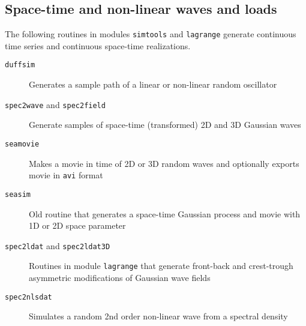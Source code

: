 \subsection{Space-time and non-linear waves and loads}
The following routines in modules {\tt simtools} and {\tt lagrange} generate 
continuous time series and continuous space-time realizations. 
\begin{description}
\item[{\tt duffsim}] Generates a sample path of a 
linear or non-linear random oscillator 
\item[{\tt spec2wave} and {\tt spec2field}] Generate samples of space-time 
(transformed) 
 2D and 3D Gaussian waves  
\item[{\tt seamovie}] Makes a movie in time of 2D or 3D random waves
and optionally exports movie in {\tt avi} format  
\item[{\tt seasim}] Old routine that generates a space-time Gaussian process and movie 
with 1D or 2D space parameter 
\item[{\tt spec2ldat} and {\tt spec2ldat3D}] Routines in module {\tt lagrange} that generate 
front-back and crest-trough asymmetric 
modifications of Gaussian wave fields
\item[{\tt spec2nlsdat}] Simulates a random 2nd order 
non-linear wave from a spectral density
\end{description}

